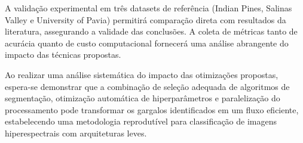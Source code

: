 A validação experimental em três datasets de referência (Indian Pines, Salinas Valley e University of Pavia) permitirá comparação direta com resultados da literatura, assegurando a validade das conclusões. A coleta de métricas tanto de acurácia quanto de custo computacional fornecerá uma análise abrangente do impacto das técnicas propostas.

Ao realizar uma análise sistemática do impacto das otimizações propostas, espera-se demonstrar que a combinação de seleção adequada de algoritmos de segmentação, otimização automática de hiperparâmetros e paralelização do processamento pode transformar os gargalos identificados em um fluxo eficiente, estabelecendo uma metodologia reprodutível para classificação de imagens hiperespectrais com arquiteturas leves.